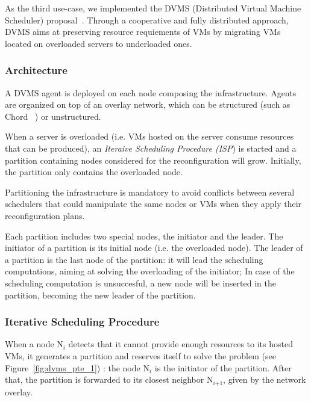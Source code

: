 As the third use-case, we implemented the DVMS
(Distributed Virtual Machine Scheduler) proposal~\cite{quesnel:cpe2012}.
Through a cooperative and fully distributed approach, DVMS aims at
preserving resource requiements of VMs by migrating VMs located on
overloaded servers to underloaded ones.


\subsubsection{Architecture}
A DVMS agent is deployed on each node composing the infrastructure.
Agents are organized on top of an overlay network, which can be structured (such as
Chord ~\cite{stoica:2001:sigcomm01}) or unstructured.

When a server is overloaded (i.e. VMs hosted on the server consume resources
that can be produced), an \emph{Iteraive Scheduling Procedure (ISP})  is started and a partition
containing nodes considered for the reconfiguration will grow. Initially, the
partition only contains the overloaded node.

Partitioning the infrastructure is mandatory to avoid conflicts between several
schedulers that could manipulate the same nodes or VMs when they apply their
reconfiguration plans.

Each partition includes two special nodes, the initiator and the leader.
The initiator of a partition is its initial node (i.e. the overloaded node).
The leader of a partition is the last node of the partition: it will lead the
scheduling computations, aiming at solving the overloading of the initiator;
In case of the scheduling computation is unsuccesful, a new node will be
inserted in the partition, becoming the new leader of the partition.


\subsubsection{Iterative Scheduling Procedure}

When a node N\(_{\textit{i}}\) detects that it cannot provide enough resources
to its hosted VMs, it generates a partition and reserves itself to solve the
problem (see Figure~\ref{fig:dvms_pte_1}) : the node N\(_{\textit{i}}\) is the
initiator of the partition. After that, the partition is forwarded to its
closest neighbor N\(_{\textit{i+1}}\), given by the network overlay.

